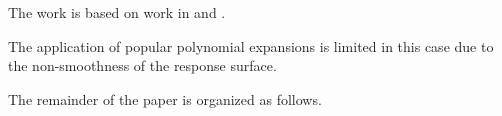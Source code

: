 The work is based on work in \cite{klimke2006} and \cite{ma2009}.

The application of popular polynomial expansions is limited in this case due to
the non-smoothness of the response surface.

The remainder of the paper is organized as follows.
